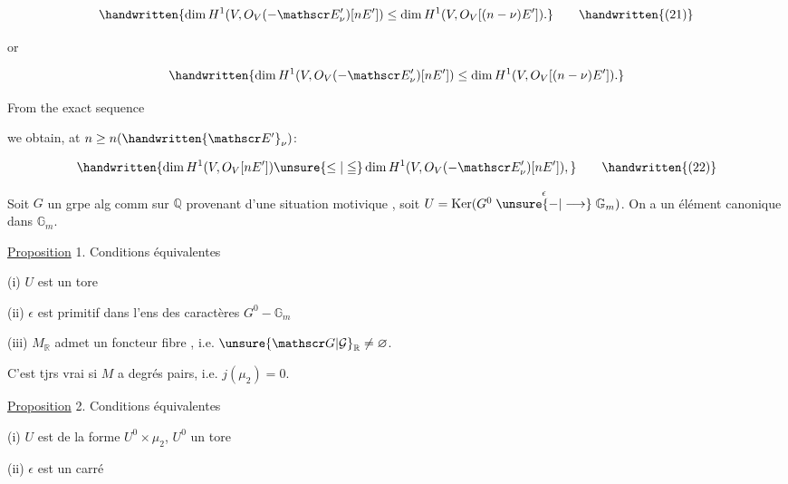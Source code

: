 \[
\handwritten{\dim H^1(V,O_V(-\mathscr E'_\nu)[nE'])\leq\dim H^1(V,O_V[(n-\nu)E']).}\tag*{\handwritten{(21)}}
\]

or

\[
\handwritten{\dim H^1(V,O_V(-\mathscr E'_\nu)[nE'])\leq\dim H^1(V,O_V[(n-\nu)E']).}
\]

From the exact sequence


we obtain, at $n\geq n(\handwritten{\mathscr E'}_\nu)$:

\[
\handwritten{\dim H^1(V,O_V[nE'])\unsure{\leq|\leqq}\dim H^1(V,O_V(-\mathscr E'_\nu)[nE']),}\tag*{\handwritten{(22)}}
\]



Soit $G$ un grpe  alg comm sur $\mathbb Q$ provenant
d'une situation motivique , soit $U=\operatorname{Ker}(G^0\mathrel{\mathop{\unsure{-|\longrightarrow}}\limits^{\epsilon}}\mathbb G_m)$.
On a  un élément canonique dans $\mathbb G_m$.

\uline{Proposition} 1. Conditions équivalentes

(i) $U$ est un tore

(ii) $\epsilon$ est primitif dans l'ens des caractères $G^0\mathrel{-}\mathbb G_m$

(iii) $M_{\mathbb R}$ admet un foncteur fibre , i.e. $\unsure{\mathscr G|\mathcal G}_{\mathbb R}\ne\varnothing$.

C'est tjrs vrai si $M$ a degrés pairs, i.e. $j(\mu_2)=0$.

\uline{Proposition} 2. Conditions équivalentes

(i) $U$ est de la forme $U^0\times\mu_2$, $U^0$ un tore

(ii) $\epsilon$ est  un carré 

